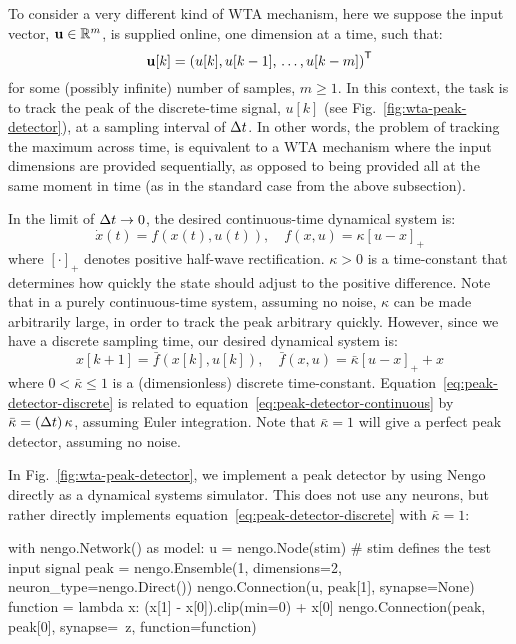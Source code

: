 To consider a very different kind of WTA mechanism, here we suppose the input vector, $\mathbf{u} \in \mathbb{R}^m$, is supplied online, one dimension at a time, such that:
$$\mathbf{u}[k] = {\left( u[k] \text{,}\, u[k-1] \text{,}\, \ldots \text{,}\, u[k-m] \right)}^\mathsf{T}$$
for some (possibly infinite) number of samples, $m \ge 1$.
In this context, the task is to track the peak of the discrete-time signal, $u[k]$ (see Fig.~\ref{fig:wta-peak-detector}), at a sampling interval of $\Delta t{}$.
In other words, the problem of tracking the maximum across time, is equivalent to a WTA mechanism where the input dimensions are provided sequentially, as opposed to being provided all at the same moment in time (as in the standard case from the above subsection).

In the limit of $\Delta t{} \rightarrow 0$, the desired continuous-time dynamical system is:
\begin{equation}
\label{eq:peak-detector-continuous}
\dot{x}(t) = f(x(t), u(t)), \quad f(x, u) = \kappa \left[u - x \right]_+
\end{equation}
where $\left[ \cdot \right]_+$ denotes positive half-wave rectification. $\kappa > 0$ is a time-constant that determines how quickly the state should adjust to the positive difference. Note that in a purely continuous-time system, assuming no noise, $\kappa$ can be made arbitrarily large, in order to track the peak arbitrary quickly. 
However, since we have a discrete sampling time, our desired dynamical system is:
\begin{equation}
\label{eq:peak-detector-discrete}
x[k + 1] = \bar{f}(x[k], u[k]), \quad \bar{f}(x, u) = \bar{\kappa} \left[u - x \right]_+ + x
\end{equation}
where $0 < \bar{\kappa} \le 1$ is a (dimensionless) discrete time-constant.
Equation~\ref{eq:peak-detector-discrete} is related to equation~\ref{eq:peak-detector-continuous} by $\bar{\kappa} = \left( \Delta t{} \right) \kappa$, assuming Euler integration.
Note that $\bar{\kappa} = 1$ will give a perfect peak detector, assuming no noise.

In Fig.~\ref{fig:wta-peak-detector}, we implement a peak detector by using Nengo directly as a dynamical systems simulator. This does not use any neurons, but rather directly implements equation~\ref{eq:peak-detector-discrete} with $\bar{\kappa} = 1$:

\begin{python}
with nengo.Network() as model:
    u = nengo.Node(stim)  # stim defines the test input signal
    peak = nengo.Ensemble(1, dimensions=2, neuron_type=nengo.Direct())
    nengo.Connection(u, peak[1], synapse=None)
    function = lambda x: (x[1] - x[0]).clip(min=0) + x[0]
    nengo.Connection(peak, peak[0], synapse=~z, function=function)
\end{python}

